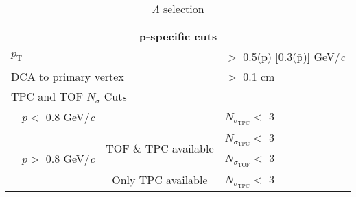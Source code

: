 \documentclass[ALICE,manyauthors]{cernphprep}
\newcommand{\Lam}{$\Lambda$\xspace}
\begin{document}
\begin{table}[htbp]
\begin{tabular}{lc|c|l}
   
   \multicolumn{4}{c}{\textbf{p-specific cuts}} \\
   \hline
   \multicolumn{3}{l|}{$p_{\mathrm{T}}$} & $ > $ 0.5(p) [0.3($\bar{\mathrm{p}}$)] GeV/\textit{c} \\
   \hline
   \multicolumn{3}{l|}{DCA to primary vertex} & $>$ 0.1 cm \\
   \hline
   \multicolumn{4}{l}{TPC and TOF $N_{\sigma}$ Cuts} \\
   \cline{2-4}
    & \multicolumn{1}{c}{$p <$ 0.8 GeV/\textit{c}} & & $N_{\sigma_{\mathrm{TPC}}} <$ 3 \\
   \cline{2-4}
    & \multicolumn{1}{c}{\multirow{3}{*}{$p >$ 0.8 GeV/\textit{c}}} &  \multirow{2}{*}{TOF \& TPC available} & $N_{\sigma_{\mathrm{TPC}}} <$ 3 \\
    & \multicolumn{2}{c|}{} & $N_{\sigma_{\mathrm{TOF}}} <$ 3 \\
   \cline{3-4}
    & \multicolumn{1}{c}{} & Only TPC available & $N_{\sigma_{\mathrm{TPC}}} <$ 3 \\
   \hline   
  \end{tabular}
 \caption{\Lam selection}
 \label{tab:LamCuts} 
\end{table}
\end{document}
